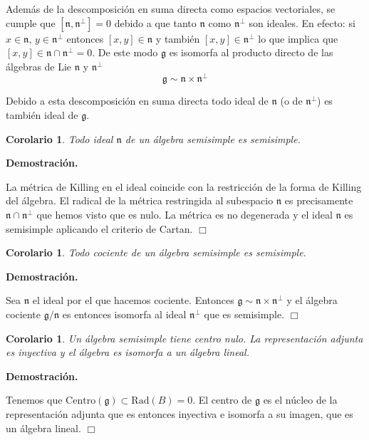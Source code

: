 \documentclass[a4paper,draft,12pt]{scrartcl}
\newtheorem{cor}[teo]{Corolario}%
\newcommand{\dem}{\noindent \textbf{Demostración. }\vspace{0.3 cm}}%
\newcommand{\g}{\mathfrak{g}}%
\newcommand{\fin}{ $\Box $ \vspace{0.4 cm}}
\begin{document}
Además de la descomposición en suma directa como espacios vectoriales, se cumple que $[\mathfrak{n},\mathfrak{n}^\perp]=0$ debido a que tanto $\mathfrak{n}$ como $\mathfrak{n}^\perp$ son ideales.  En efecto: si $x  \in \mathfrak{n}$, $y \in \mathfrak{n}^\perp$ entonces $[x,y] \in \mathfrak{n}$ y también $[x,y] \in \mathfrak{n}^\perp$ lo que implica que $[x,y] \in \mathfrak{n}\cap \mathfrak{n}^\perp=0$. De este modo $\g$ es isomorfa al producto directo de las álgebras de Lie $\mathfrak{n}$ y $\mathfrak{n}^\perp$
$$
\g \sim \mathfrak{n} \times \mathfrak{n}^\perp
$$

Debido a esta descomposición en suma directa  todo ideal de $\mathfrak{n}$ (o de $\mathfrak{n}^\perp$)  es también ideal de $\g$.  



\begin{cor}

Todo ideal $ \mathfrak{n}$ de un álgebra semisimple es semisimple.

\end{cor}

\dem

La métrica de Killing en el ideal coincide con la restricción de la forma de Killing del álgebra.  El radical de la métrica restringida al subespacio $\mathfrak{n}$ es precisamente $\mathfrak{n} \cap \mathfrak{n}^\perp$ que hemos visto que es nulo.  La métrica es no degenerada y el ideal $\mathfrak{n}$ es semisimple aplicando el criterio de Cartan.  \fin

\begin{cor}

Todo cociente de un álgebra semisimple es semisimple.

\end{cor}

\dem

Sea $\mathfrak{n}$ el ideal por el que hacemos cociente.  Entonces $\g \sim \mathfrak{n}\times \mathfrak{n}^\perp$ y el álgebra cociente $\g /\mathfrak{n}$ es entonces isomorfa al ideal $\mathfrak{n}^\perp$ que es semisimple. \fin

\begin{cor}

Un álgebra semisimple tiene centro nulo.  La representación adjunta es inyectiva y  el álgebra es isomorfa a un álgebra lineal.

\end{cor}

\dem

Tenemos que $\mathrm{Centro}(\g) \subset \mathrm{Rad}(B)=0$.  El centro de $\g$ es el núcleo de la representación adjunta que es entonces inyectiva e isomorfa a su imagen, que es un álgebra lineal.   \fin
\end{document}
